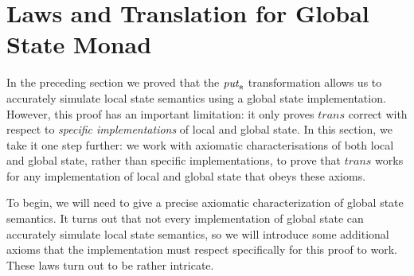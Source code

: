 \documentclass{jfp}
\newcommand{\Varid}[1]{\mathit{#1}}
\let\Varid\mathit
\begin{document}
\section{Laws and Translation for Global State Monad}
\label{sec:ctxt-trans}
In the preceding section we proved that the \ensuremath{\Varid{put}_{\scaleobj{0.7}{\sf R}}} transformation allows us to
accurately simulate local state semantics using a global state implementation.
However, this proof has an important limitation: it only proves \ensuremath{\Varid{trans}} correct
with respect to {\em specific implementations} of local and global state.
In this section, we take it one step further: we work with axiomatic
characterisations of both local and global state, rather than specific
implementations, to prove that \ensuremath{\Varid{trans}} works for any implementation of local
and global state that obeys these axioms.

To begin, we will need to give a precise axiomatic characterization of global
state semantics. It turns out that not every implementation of global state
can accurately simulate local state semantics, so we will introduce some
additional axioms that the implementation must respect specifically for this
proof to work. These laws turn out to be rather intricate.
\end{document}
